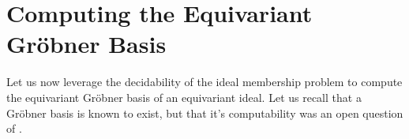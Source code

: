 \section{Computing the Equivariant Gröbner Basis}
\label{sec:equivariant-grobner-basis}

Let us now leverage the decidability of the ideal membership problem to compute
the equivariant Gröbner basis of an equivariant ideal. Let us recall that a
Gröbner basis is known to exist, but that it's computability was an open
question of \cite{GHOLAS24}.
